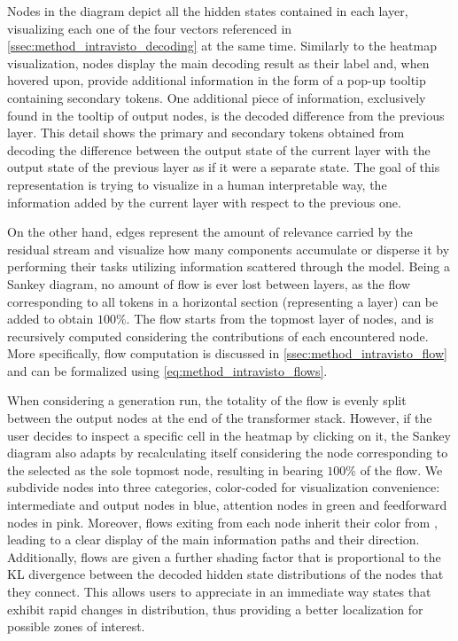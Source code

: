 Nodes in the diagram depict all the hidden states contained in each layer, visualizing each one of the four vectors referenced in \cref{ssec:method_intravisto_decoding} at the same time.
Similarly to the heatmap visualization, nodes display the main decoding result as their label and, when hovered upon, provide additional information in the form of a pop-up tooltip containing secondary tokens.
One additional piece of information, exclusively found in the tooltip of output nodes, is the decoded difference from the previous layer.
This detail shows the primary and secondary tokens obtained from decoding the difference between the output state of the current layer with the output state of the previous layer as if it were a separate state.
The goal of this representation is trying to visualize in a human interpretable way, the information added by the current layer with respect to the previous one.

On the other hand, edges represent the amount of relevance carried by the residual stream and visualize how many components accumulate or disperse it by performing their tasks utilizing information scattered through the model.
Being a Sankey diagram, no amount of flow is ever lost between layers, as the flow corresponding to all tokens in a horizontal section (representing a layer) can be added to obtain $100\%$.
The flow starts from the topmost layer of nodes, and is recursively computed considering the contributions of each encountered node.
More specifically, flow computation is discussed  in \cref{ssec:method_intravisto_flow} and can be formalized using \cref{eq:method_intravisto_flows}.

When considering a  generation run, the totality of the flow is evenly split between the output nodes at the end of the transformer stack.
However, if the user decides to inspect a specific cell in the heatmap by clicking on it, the Sankey diagram also adapts by recalculating itself considering the node corresponding to the selected as the sole topmost node, resulting in  bearing $100\%$ of the flow.
We subdivide nodes into three categories, color-coded for visualization convenience: intermediate and output nodes in blue, attention nodes in green and feedforward nodes in pink.
Moreover, flows exiting from each node inherit their color from , leading to a clear display of the main information paths and their direction.
Additionally, flows are given a further shading factor that is proportional to the KL divergence between the decoded hidden state distributions of the nodes that they connect.
This allows users to appreciate in an immediate way states that exhibit rapid changes in distribution, thus providing a better localization for possible zones of interest.

